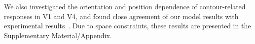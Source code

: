 We also investigated the orientation and position dependence of contour-related responses in V1 and V4, and found close agreement of our model results with experimental results~\citep{Chen_etal14}. Due to space constraints, these results are presented in the Supplementary Material/Appendix. %

%
%
